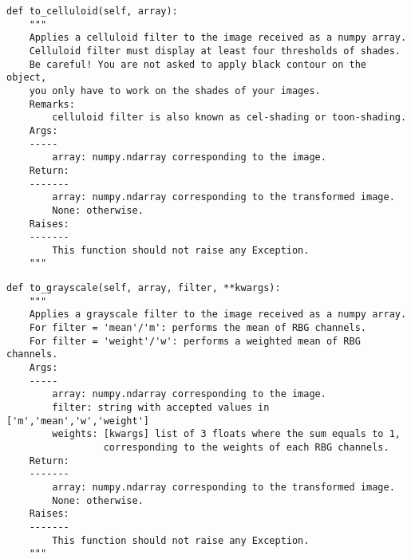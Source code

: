\documentclass{42-en}
\begin{document}
\begin{verbatim}
def to_celluloid(self, array):
    """
    Applies a celluloid filter to the image received as a numpy array.
    Celluloid filter must display at least four thresholds of shades.
    Be careful! You are not asked to apply black contour on the object,
    you only have to work on the shades of your images.
    Remarks:
        celluloid filter is also known as cel-shading or toon-shading.
    Args:
    -----
        array: numpy.ndarray corresponding to the image.
    Return:
    -------
        array: numpy.ndarray corresponding to the transformed image.
        None: otherwise.
    Raises:
    -------
        This function should not raise any Exception.
    """
\end{verbatim}
\begin{verbatim}
def to_grayscale(self, array, filter, **kwargs):
    """
    Applies a grayscale filter to the image received as a numpy array.
    For filter = 'mean'/'m': performs the mean of RBG channels.
    For filter = 'weight'/'w': performs a weighted mean of RBG channels.
    Args:
    -----
        array: numpy.ndarray corresponding to the image.
        filter: string with accepted values in ['m','mean','w','weight']
        weights: [kwargs] list of 3 floats where the sum equals to 1,
                 corresponding to the weights of each RBG channels.
    Return:
    -------
        array: numpy.ndarray corresponding to the transformed image.
        None: otherwise.
    Raises:
    -------
        This function should not raise any Exception.
    """
\end{verbatim}
\end{document}
